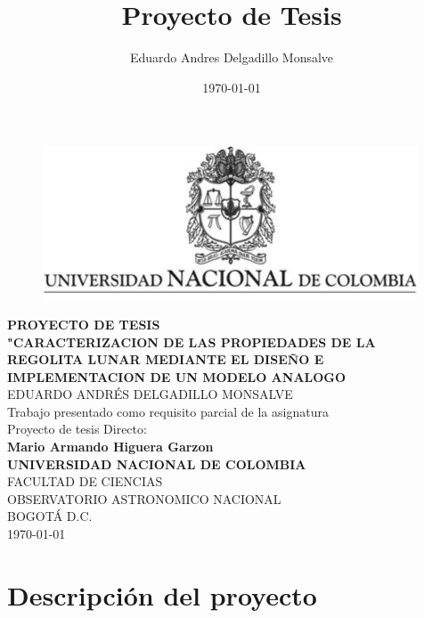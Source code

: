 \documentclass[12pt]{article}
\title{Proyecto de Tesis}
\author{Eduardo Andres Delgadillo Monsalve}
\date{\today}
\begin{document}
\renewcommand{\tablename}{Tabla}%
\renewcommand{\listtablename}{Índice de tablas}
\begin{titlepage}
    \thispagestyle{empty}
    \begin{center}
        \begin{figure}
        \centering%
        \includegraphics{images/EscudoUN.png}
    \end{figure}
    
    \vspace{1cm}
    
        \textbf{PROYECTO DE TESIS\\"CARACTERIZACION DE LAS PROPIEDADES DE LA REGOLITA LUNAR MEDIANTE EL DISEÑO E IMPLEMENTACION DE UN MODELO ANALOGO}\\[1.3in]
      
    EDUARDO ANDRÉS DELGADILLO MONSALVE \\  [1.5in]
 Trabajo presentado como requisito parcial de la asignatura\\  Proyecto de tesis  Directo:\\[3mm] \textbf {\large{Mario Armando Higuera Garzon}}\\[1.5in]
   \textbf{UNIVERSIDAD NACIONAL DE COLOMBIA}\\
   FACULTAD  DE CIENCIAS\\
   OBSERVATORIO ASTRONOMICO NACIONAL\\
   BOGOTÁ D.C.\\
   \today
    \end{center}
\end{titlepage}

\newpage
\thispagestyle{empty}
\tableofcontents
\thispagestyle{empty}
\newpage



\newpage

\setcounter{page}{1}
\section{Descripción del proyecto}
\end{document}
